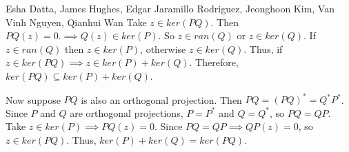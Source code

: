 

\begin{solution}{Esha Datta, James Hughes, Edgar Jaramillo Rodriguez, Jeonghoon Kim, Van Vinh Nguyen, Qianhui Wan}
        Take $z \in ker(PQ)$.
        Then $PQ(z)=0.
        \implies Q(z) \in ker(P)$. So $z \in ran(Q)$ or $z \in ker(Q)$.
        If $z \in ran(Q)$ then $z \in ker(P)$, otherwise $z \in ker (Q)$.
        Thus, if $z \in ker(PQ) \implies z\in ker(P) +ker(Q)$.
        Therefore, $ker(PQ) \subseteq ker(P) + ker(Q)$.

        Now suppose $PQ$ is also an orthogonal projection.
        Then $PQ=(PQ)^*=Q^*P^*$.
        Since $P$ and $Q$ are orthogonal projections, $P=P^*$ and $Q=Q^*$, so $PQ=QP$.
        Take $z \in ker(P) \implies PQ(z)=0$.
        Since $PQ=QP \implies QP(z)=0$, so $z \in ker(PQ)$.
        Thus, $ker(P)+ker(Q)=ker(PQ)$.
\end{solution}

